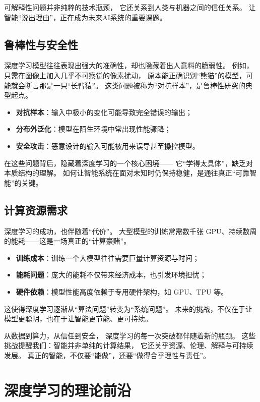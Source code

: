 可解释性问题并非纯粹的技术瓶颈，  
它还关系到人类与机器之间的信任关系。  
让智能“说出理由”，正在成为未来AI系统的重要课题。

\subsection{鲁棒性与安全性}

深度学习模型往往表现出强大的准确性，却也隐藏着出人意料的脆弱性。  
例如，只需在图像上加入几乎不可察觉的像素扰动，  
原本能正确识别“熊猫”的模型，可能就会断言那是一只“长臂猿”。  
这类问题被称为“对抗样本”，是鲁棒性研究的典型起点。

\begin{itemize}
\item \textbf{对抗样本}：输入中极小的变化可能导致完全错误的输出；
\item \textbf{分布外泛化}：模型在陌生环境中常出现性能骤降；
\item \textbf{安全攻击}：恶意设计的输入可能被用来误导甚至操控模型。
\end{itemize}

在这些问题背后，隐藏着深度学习的一个核心困境——  
它“学得太具体”，缺乏对本质结构的理解。  
如何让智能系统在面对未知时仍保持稳健，是通往真正“可靠智能”的关键。

\subsection{计算资源需求}

深度学习的成功，也伴随着“代价”。  
大型模型的训练常需数千张 GPU、持续数周的能耗——这是一场真正的“计算豪赌”。  

\begin{itemize}
\item \textbf{训练成本}：训练一个大模型往往需要巨量计算资源与时间；
\item \textbf{能耗问题}：庞大的能耗不仅带来经济成本，也引发环境担忧；
\item \textbf{硬件依赖}：模型性能高度依赖于专用硬件架构，如 GPU、TPU 等。
\end{itemize}

这使得深度学习逐渐从“算法问题”转变为“系统问题”。  
未来的挑战，不仅在于让模型更聪明，也在于让智能更节能、更可持续。

从数据到算力，从信任到安全，  
深度学习的每一次突破都伴随着新的瓶颈。  
这些挑战提醒我们：智能并非单纯的计算结果，  
它还关乎资源、伦理、解释与可持续发展。  
真正的智能，不仅要“能做”，还要“做得合乎理性与责任”。

\section{深度学习的理论前沿}

